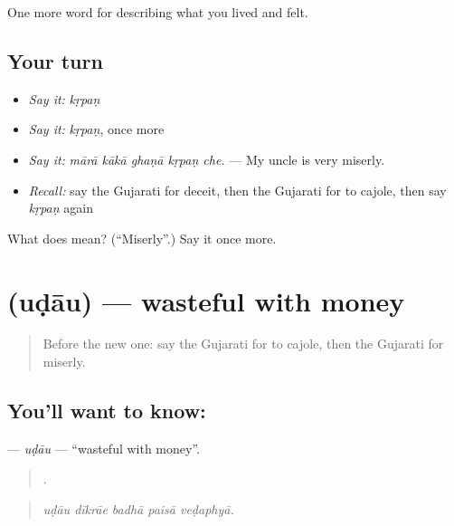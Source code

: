 \begin{grammarlens}[title={What you've built}]
One more word for describing what you lived and felt.
\end{grammarlens}

\subsection*{Your turn}
\begin{itemize}
\raggedright
  \item \emph{Say it:} \emph{kṛpaṇ}
  \item \emph{Say it:} \emph{kṛpaṇ}, once more
  \item \emph{Say it:} \emph{mārā kākā ghaṇā kṛpaṇ che.} — My uncle is very miserly.
  \item \emph{Recall:} say the Gujarati for deceit, then the Gujarati for to cajole, then say \emph{kṛpaṇ} again
\end{itemize}

\begin{tcolorbox}[breakable,colback=teal!4,colframe=teal!35!black,title={Before you move on}]
What does  mean? (\textquotedblleft{}Miserly\textquotedblright{}.) Say it once more.
\end{tcolorbox}
\section[\texorpdfstring{\gu{ઉડાઉ} (uḍāu)}{ઉડાઉ (uḍāu)}]{ (uḍāu) — wasteful with money}

\label{lesson:GU-C461-udau}



\begin{quote}
Before the new one: say the Gujarati for to cajole, then the Gujarati for miserly.
\end{quote}

\subsection*{You'll want to know: }
\textbf{} — \emph{uḍāu} — \textquotedblleft{}wasteful with money\textquotedblright{}.

\begin{quote}
    .
\end{quote}

\begin{quote}
\emph{uḍāu dīkrāe badhā paisā veḍaphyā.}
\end{quote}

